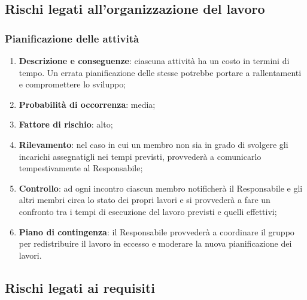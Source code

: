 \subsection{Rischi legati all'organizzazione del lavoro}
	\subsubsection{Pianificazione delle attività}
	\begin{enumerate}
		\item \textbf{Descrizione e conseguenze}: ciascuna attività ha un costo in termini di tempo. Un errata pianificazione delle stesse potrebbe portare a rallentamenti e compromettere lo sviluppo; 
		\item \textbf{Probabilità di occorrenza}: media;
		\item \textbf{Fattore di rischio}: alto;
		\item \textbf{Rilevamento}: nel caso in cui un membro non sia in grado di svolgere gli incarichi assegnatigli nei tempi previsti, provvederà a comunicarlo tempestivamente al Responsabile;		
		\item \textbf{Controllo}: ad ogni incontro ciascun membro notificherà il Responsabile e gli altri membri circa lo stato dei propri lavori e si provvederà a fare un confronto tra i tempi di esecuzione del lavoro previsti e quelli effettivi; 
		\item \textbf{Piano di contingenza}: il Responsabile provvederà a coordinare il gruppo per redistribuire il lavoro in eccesso e moderare la nuova pianificazione dei lavori.
	\end{enumerate}
	
\subsection{Rischi legati ai requisiti}
